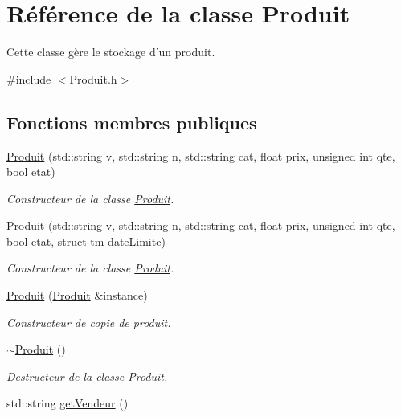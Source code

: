 \hypertarget{class_produit}{\section{Référence de la classe Produit}
\label{class_produit}
}


Cette classe gère le stockage d'un produit.  




{\ttfamily \#include $<$Produit.\-h$>$}

\subsection*{Fonctions membres publiques}
\begin{DoxyCompactItemize}
\item 
\hyperlink{class_produit_a5b23bea0ed80afaa80e6e0d6b01d68a8}{Produit} (std\-::string v, std\-::string n, std\-::string cat, float prix, unsigned int qte, bool etat)
\begin{DoxyCompactList}\small\item\em Constructeur de la classe \hyperlink{class_produit}{Produit}. \end{DoxyCompactList}\item 
\hyperlink{class_produit_ac0136c815dafc47b3959c5fd5ee763cd}{Produit} (std\-::string v, std\-::string n, std\-::string cat, float prix, unsigned int qte, bool etat, struct tm date\-Limite)
\begin{DoxyCompactList}\small\item\em Constructeur de la classe \hyperlink{class_produit}{Produit}. \end{DoxyCompactList}\item 
\hyperlink{class_produit_a0b056e8aa75a367e0ba3d80fc0055e2c}{Produit} (\hyperlink{class_produit}{Produit} \&instance)
\begin{DoxyCompactList}\small\item\em Constructeur de copie de produit. \end{DoxyCompactList}\item 
\hyperlink{class_produit_a7b789cfa3048436fd050cb565b499c03}{$\sim$\-Produit} ()
\begin{DoxyCompactList}\small\item\em Destructeur de la classe \hyperlink{class_produit}{Produit}. \end{DoxyCompactList}\item 
std\-::string \hyperlink{class_produit_abb06f356f5471dfc236f17412d4a6749}{get\-Vendeur} ()

\end{DoxyCompactItemize}
